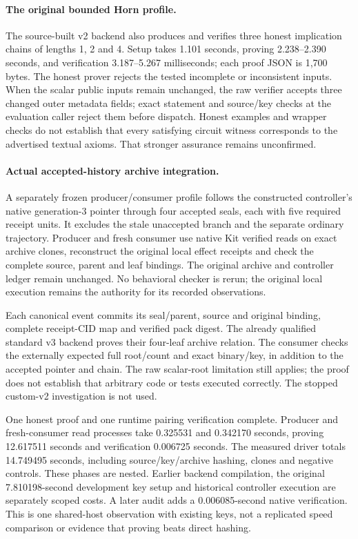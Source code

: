\paragraph{The original bounded Horn profile.}
The source-built v2 backend also produces and verifies three honest implication
chains of lengths 1, 2 and 4. Setup takes 1.101 seconds, proving
2.238--2.390 seconds, and verification
3.187--5.267 milliseconds; each proof JSON is 1,700 bytes.
The honest prover rejects the tested incomplete or inconsistent inputs.
When the scalar public inputs remain unchanged, the raw verifier accepts three
changed outer metadata fields; exact statement and source/key checks at the
evaluation caller reject them before dispatch. Honest examples and wrapper
checks do not establish that every satisfying circuit witness corresponds to
the advertised textual axioms. That stronger assurance remains unconfirmed.


\paragraph{Actual accepted-history archive integration.}
A separately frozen producer/consumer profile follows the constructed
controller's native generation-3 pointer through four accepted seals, each
with five required receipt units. It excludes the stale unaccepted branch and
the separate ordinary trajectory. Producer and fresh consumer use native Kit
verified reads on exact archive clones, reconstruct the original local effect
receipts and check the complete source, parent and leaf bindings. The original
archive and controller ledger remain unchanged. No behavioral checker is rerun;
the original local execution remains the authority for its recorded observations.

Each canonical event commits its seal/parent, source and original binding,
complete receipt-CID map and verified pack digest. The already qualified
standard v3 backend proves their four-leaf archive relation. The consumer
checks the externally expected full root/count and exact binary/key, in addition
to the accepted pointer and chain. The raw scalar-root limitation still applies;
the proof does not establish that arbitrary code or tests executed correctly.
The stopped custom-v2 investigation is not used.

One honest proof and one runtime pairing verification complete. Producer and
fresh-consumer read processes take 0.325531 and 0.342170 seconds, proving
12.617511 seconds and verification 0.006725 seconds. The measured driver
totals 14.749495 seconds, including source/key/archive hashing, clones and
negative controls. These phases are nested. Earlier backend compilation, the
original 7.810198-second development key setup and historical controller
execution are separately scoped costs. A later audit adds a 0.006085-second
native verification. This is one shared-host observation with existing keys,
not a replicated speed comparison or evidence that proving beats direct hashing.

